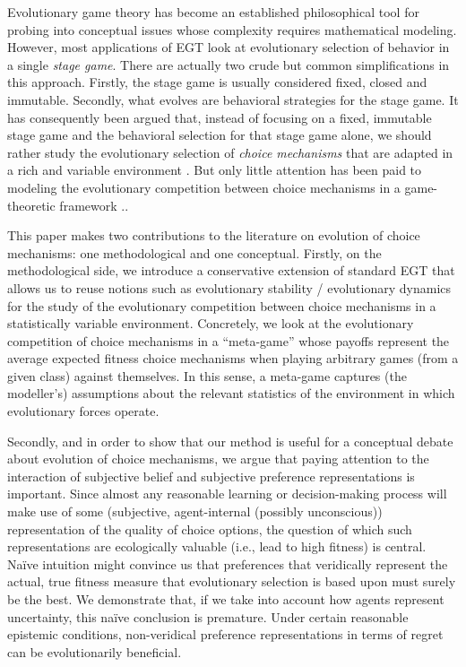 \documentclass[fleqn,reqno,11pt]{article}
\begin{document}
Evolutionary game theory has become an established philosophical tool for probing into
conceptual issues whose complexity requires mathematical modeling. However, most applications
of EGT look at evolutionary selection of behavior in a single \emph{stage game}. There are
actually two crude but common simplifications in this approach. Firstly, the stage game is
usually considered fixed, closed and immutable. Secondly, what evolves are behavioral
strategies for the stage game. It has consequently been argued that, instead of focusing on a
fixed, immutable stage game and the behavioral selection for that stage game alone, we should
rather study the evolutionary selection of \emph{choice mechanisms} that are adapted in a rich
and variable environment
\citep[e.g.][]{FawcettHamblin2013:Exposing-the-be,McNamara2013:Towards-a-Riche}. %
But only little attention has been paid to modeling the evolutionary competition between choice
mechanisms in a game-theoretic framework \citep[but
see][]{ZollmanSmead2010:Plasticity-and-,SmeadZollman2013:The-Stability-o}..

This paper makes two contributions to the literature on evolution of choice mechanisms: one
methodological and one conceptual. Firstly, on the methodological side, we introduce a
conservative extension of standard EGT that allows us to reuse notions such as evolutionary
stability / evolutionary dynamics for the study of the evolutionary competition between choice
mechanisms in a statistically variable environment. Concretely, we look at the evolutionary
competition of choice mechanisms in a ``meta-game'' whose payoffs represent the average
expected fitness choice mechanisms when playing arbitrary games (from a given class) against
themselves. In this sense, a meta-game captures (the modeller's) assumptions about the relevant
statistics of the environment in which evolutionary forces operate.

Secondly, and in order to show that our method is useful for a conceptual debate about
evolution of choice mechanisms, we argue that paying attention to the interaction of subjective
belief and subjective preference representations is important. Since almost any reasonable
learning or decision-making process will make use of some (subjective, agent-internal (possibly
unconscious)) representation of the quality of choice options, the question of which such
representations are ecologically valuable (i.e., lead to high fitness) is central. Na\"ive
intuition might convince us that preferences that veridically represent the actual, true
fitness measure that evolutionary selection is based upon must surely be the best. We
demonstrate that, if we take into account how agents represent uncertainty, this na\"ive
conclusion is premature. Under certain reasonable epistemic conditions, non-veridical
preference representations in terms of regret can be evolutionarily beneficial.
\end{document}
